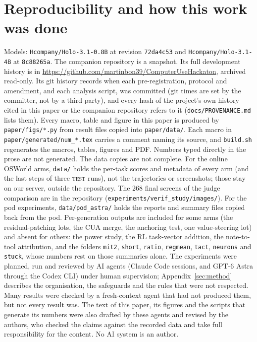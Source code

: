 \section{Reproducibility and how this work was done}
\label{sec:repro}
Models: \texttt{Hcompany/Holo-3.1-0.8B} at revision \texttt{72da4c53} and \texttt{Hcompany/Holo-3.1-4B} at \texttt{8c88265a}. %
The companion repository is a snapshot. Its full development history is in \url{https://github.com/martinbon39/ComputerUseHackaton}, archived read-only. Its git history records when each pre-registration, protocol and amendment, and each analysis script, was committed (git times are set by the committer, not by a third party), and every hash of the project's own history cited in this paper or the companion repository refers to it (\texttt{docs/PROVENANCE.md} lists them). %
Every macro, table and figure in this paper is produced by \texttt{paper/figs/*.py} from result files copied into \texttt{paper/data/}. Each macro in \texttt{paper/generated/num\_*.tex} carries a comment naming its source, and \texttt{build.sh} regenerates the macros, tables, figures and PDF. Numbers typed directly in the prose are not generated. %
The data copies are not complete. For the online OSWorld arms, \texttt{data/} holds the per-task scores and metadata of every arm (and the last steps of three \textsc{test} runs), not the trajectories or screenshots; those stay on our server, outside the repository. The 268 final screens of the judge comparison are in the repository (\texttt{experiments/verif\_study/images/}). For the pod experiments, \texttt{data/pod\_astra/} holds the reports and summary files copied back from the pod. Per-generation outputs are included for some arms (the residual-patching lots, the CUA merge, the anchoring test, one value-steering lot) and absent for others: the power study, the RL task-vector addition, the note-to-tool attribution, and the folders \texttt{mit2}, \texttt{short}, \texttt{ratio}, \texttt{regmean}, \texttt{tact}, \texttt{neurons} and \texttt{stuck}, whose numbers rest on those summaries alone. %
The experiments were planned, run and reviewed by AI agents (Claude Code sessions, and GPT-6 Astra through the Codex CLI) under human supervision; Appendix~\ref{sec:method} describes the organisation, the safeguards and the rules that were not respected. Many results were checked by a fresh-context agent that had not produced them, but not every result was. %
The text of this paper, its figures and the scripts that generate its numbers were also drafted by these agents and revised by the authors, who checked the claims against the recorded data and take full responsibility for the content. No AI system is an author.
